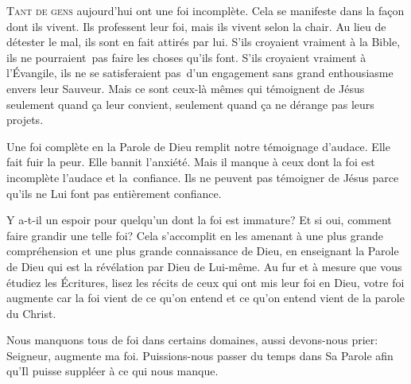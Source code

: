 



\lettrine{T}{ant de gens} aujourd'hui ont une foi incomplète.
 Cela se manifeste dans la fa\c{c}on dont ils vivent. Ils professent leur foi,
 mais ils vivent selon la chair. Au lieu de détester le mal,
 ils sont en fait attirés par lui. S'ils croyaient vraiment à la Bible,
 ils ne pourraient~pas faire les choses qu'ils font.
 S'ils croyaient vraiment à l'Évangile, ils ne se satisferaient pas~d'un
 engagement sans grand enthousiasme envers leur Sauveur.
 Mais ce sont ceux-là mêmes qui témoignent de Jésus seulement
 quand \c{c}a leur convient, seulement quand \c{c}a ne dérange pas leurs projets.


Une foi complète en la Parole de Dieu remplit notre témoignage d'audace.
 Elle fait fuir la peur. Elle bannit l'anxiété. Mais il manque à ceux
 dont la foi est incomplète l'audace et la~confiance.
 Ils ne peuvent pas témoigner de Jésus parce qu'ils ne Lui font pas
 entièrement confiance.

Y a-t-il un espoir pour quelqu'un dont la foi est immature?
 Et si oui, comment faire grandir une telle foi? Cela s'accomplit
 en les amenant à une plus grande compréhension et une plus grande
 connaissance de Dieu, en enseignant la Parole de Dieu qui est la révélation
 par Dieu de Lui-même. Au fur et à mesure que vous étudiez les Écritures,
 lisez les récits de ceux qui ont mis leur foi en Dieu, votre foi augmente
 \ocadr car la foi vient de ce qu'on entend et ce qu'on entend vient
 de la parole du Christ.

Nous manquons tous de foi dans certains domaines, aussi devons-nous prier: 
 \Og Seigneur, augmente ma foi. \Fg{}
 Puissions-nous passer du temps dans Sa Parole afin qu'Il puisse
 suppléer à ce qui nous manque.

\dvrule



